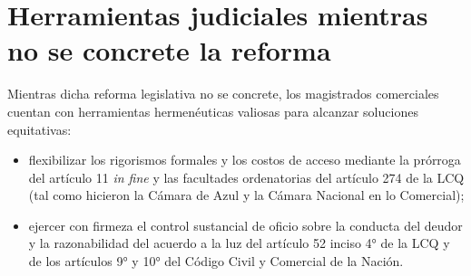 \documentclass[12pt,oneside]{book}
\begin{document}
\section{Herramientas judiciales mientras no se concrete la reforma}

Mientras dicha reforma legislativa no se concrete, los magistrados comerciales cuentan con herramientas hermenéuticas valiosas para alcanzar soluciones equitativas:

\begin{itemize}
    \item flexibilizar los rigorismos formales y los costos de acceso mediante la prórroga del artículo 11 \textit{in fine} y las facultades ordenatorias del artículo 274 de la LCQ (tal como hicieron la Cámara de Azul y la Cámara Nacional en lo Comercial);
    \item ejercer con firmeza el control sustancial de oficio sobre la conducta del deudor y la razonabilidad del acuerdo a la luz del artículo 52 inciso 4° de la LCQ y de los artículos 9° y 10° del Código Civil y Comercial de la Nación.
\end{itemize}
\end{document}

